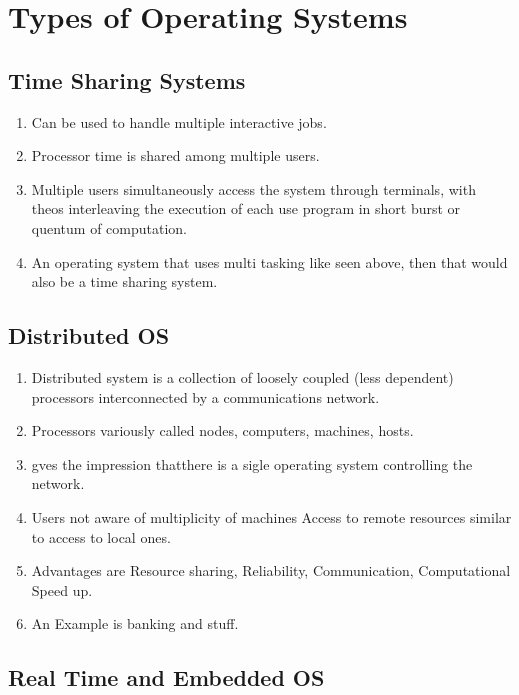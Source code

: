 \documentclass[11pt]{article}
\begin{document}
\section{Types of Operating Systems}
\subsection{Time Sharing Systems}
\begin{enumerate}
	\item Can be used to handle multiple interactive jobs.
	\item Processor time is shared among multiple users.
	\item  Multiple users simultaneously access the system through terminals, with theos interleaving the execution of each use program in short burst or quentum of computation.
	\item An operating system that uses multi tasking like seen above, then that would also be a time sharing system.
\end{enumerate}

\subsection{Distributed OS}
\begin{enumerate}
	\item Distributed system is a collection of loosely coupled (less dependent) processors interconnected by a communications network.
	\item Processors variously called nodes, computers, machines, hosts.
	\item gves the impression thatthere is a sigle operating system controlling the network.
	\item Users not aware of multiplicity of machines Access to remote resources similar to access to local ones.
	\item Advantages are Resource sharing, Reliability, Communication, Computational Speed up.
	\item An Example is banking and stuff.
\end{enumerate}

\subsection{Real Time and Embedded OS}
\end{document}
